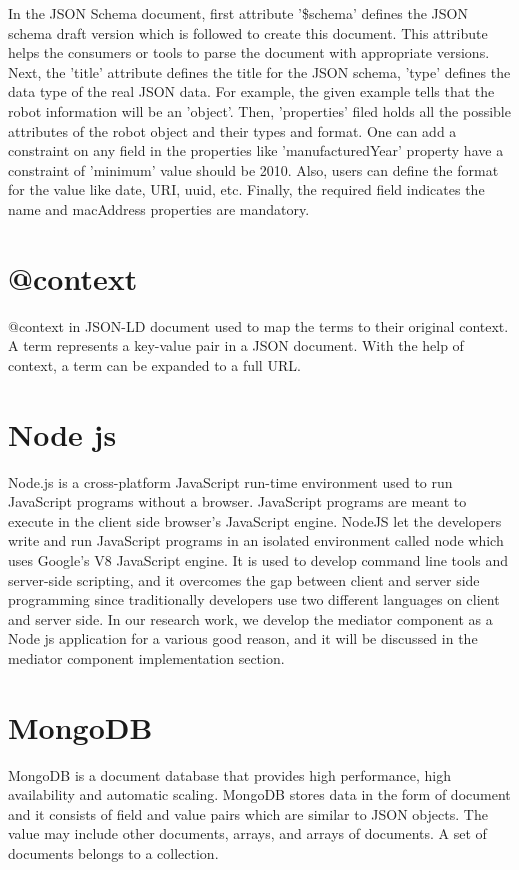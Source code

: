	
	In the JSON Schema document, first attribute '\$schema' defines the JSON schema draft version which is followed to create this document. This attribute helps the consumers or tools to parse the document with appropriate versions. Next, the 'title' attribute defines the title for the JSON schema, 'type' defines the data type of the real JSON data. For example, the given example tells that the robot information will be an 'object'. Then, 'properties' filed holds all the possible attributes of the robot object and their types and format. One can add a constraint on any field in the properties like 'manufacturedYear' property have a constraint of 'minimum' value should be 2010. Also, users can define the format for the value like date, URI, uuid, etc. Finally, the required field indicates the name and macAddress properties are mandatory.
	
	
	\section{@context}
	@context in JSON-LD document used to map the terms to their original context. A term represents a key-value pair in a JSON document. With the help of context, a term can be expanded to a full URL.
	
	\section{Node js}
	
	Node.js is a cross-platform JavaScript run-time environment used to run JavaScript programs without a browser. JavaScript programs are meant to execute in the client side browser's JavaScript engine. NodeJS let the developers write and run JavaScript programs in an isolated environment called node which uses Google's V8 JavaScript engine.  It is used to develop command line tools and server-side scripting, and it overcomes the gap between client and server side programming since traditionally developers use two different languages on client and server side. In our research work, we develop the mediator component as a Node js application for a various good reason, and it will be discussed in the mediator component implementation section.
	
	\section{MongoDB}
	MongoDB is a document database that provides high performance, high availability and automatic scaling. MongoDB stores data in the form of document and it consists of field and value pairs which are similar to JSON objects. The value may include other documents, arrays, and arrays of documents. A set of documents belongs to a collection.
	
